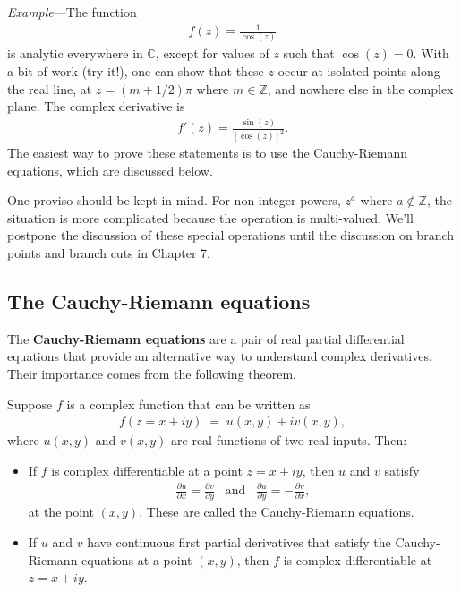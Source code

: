 \documentclass[10pt,a4paper]{article}
\begin{document}
\begin{framed}\noindent
  \textit{Example}---The function
  \begin{align}
    f(z) =
    \frac{1}{\cos(z)}
  \end{align}
  is analytic everywhere in $\mathbb{C}$, except for values of $z$
  such that $\cos(z) = 0$. With a bit of work (try it!), one can show
  that these $z$ occur at isolated points along the real line, at $z =
  (m+1/2)\pi$ where $m \in \mathbb{Z}$, and nowhere else in the
  complex plane. The complex derivative is
  \begin{align}
    f'(z) = \frac{\sin(z)}{[\cos(z)]^2}.
  \end{align}
  The easiest way to prove these statements is to use the
  Cauchy-Riemann equations, which are discussed below.
\end{framed}

One proviso should be kept in mind. For non-integer powers, $z^a$
where $a\notin \mathbb{Z}$, the situation is more complicated because
the operation is multi-valued. We'll postpone the discussion of these
special operations until the discussion on branch points and branch
cuts in Chapter 7.

\subsection{The Cauchy-Riemann equations}
\label{the-cauchy-riemann-equations}

The \textbf{Cauchy-Riemann equations} are a pair of real partial
differential equations that provide an alternative way to understand
complex derivatives. Their importance comes from the following
theorem.
\begin{framed}
  \noindent
  Suppose $f$ is a complex function that can be written as
  \begin{align}
    f(z = x + iy) \;=\; u(x,y) + i v(x,y),
  \end{align}
  where $u(x,y)$ and $v(x,y)$ are real functions of two real inputs.
  Then:

  \begin{itemize}
  \item If $f$ is complex differentiable at a point $z = x + i y$,
    then $u$ and $v$ satisfy
  \begin{align}
    \frac{\partial u}{\partial x} = \frac{\partial v}{\partial y} \;\;\;\mathrm{and}\;\;\; \frac{\partial u}{\partial y} = -\frac{\partial v}{\partial x},
  \end{align}
  at the point $(x,y)$.  These are called the Cauchy-Riemann
  equations.

\item If $u$ and $v$ have continuous first partial derivatives that
  satisfy the Cauchy-Riemann equations at a point $(x,y)$, then $f$ is
  complex differentiable at $z = x + iy$.
  \end{itemize}

\end{framed}
\end{document}

